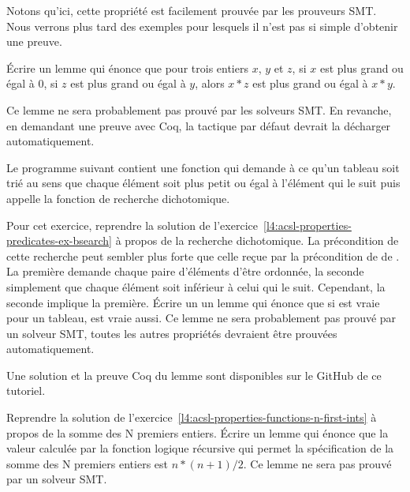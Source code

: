 Notons qu'ici, cette propriété est facilement prouvée par les prouveurs SMT. Nous
verrons plus tard des exemples pour lesquels il n'est pas si simple d'obtenir une
preuve.







Écrire un lemme qui énonce que pour trois entiers $x$, $y$ et $z$, si $x$ est
plus grand ou égal à $0$, si $z$ est plus grand ou égal à $y$, alors $x * z$ 
est  plus grand ou égal à $x * y$.


Ce lemme ne sera probablement pas prouvé par les solveurs SMT. En revanche, en
demandant une preuve avec Coq, la tactique par défaut devrait la décharger
automatiquement.


\label{l4:acsl-properties-lemmas-lsorted-gsorted}


Le programme suivant contient une fonction qui demande à ce qu'un tableau soit
trié au sens que chaque élément soit plus petit ou égal à l'élément qui le suit
puis appelle la fonction de recherche dichotomique.




Pour cet exercice, reprendre la solution de 
l'exercice~\ref{l4:acsl-properties-predicates-ex-bsearch} à propos de la recherche
dichotomique. La précondition de cette recherche peut sembler plus forte que celle
reçue par la précondition de de . La première demande
chaque paire d'éléments d'être ordonnée, la seconde simplement que chaque élément
soit inférieur à celui qui le suit. Cependant, la seconde implique la première.
Écrire un un lemme qui énonce que si  est vraie
pour un tableau,  est vraie aussi. Ce lemme ne sera probablement
pas prouvé par un solveur SMT, toutes les autres propriétés devraient être prouvées
automatiquement.


Une solution et la preuve Coq du lemme sont disponibles sur le GitHub de ce tutoriel.


\label{l4:acsl-properties-lemmas-n-first-ints}


Reprendre la solution de l'exercice~\ref{l4:acsl-properties-functions-n-first-ints}
à propos de la somme des N premiers entiers. Écrire un lemme qui énonce que la valeur
calculée par la fonction logique récursive qui permet la spécification de la somme des
N premiers entiers est $n*(n+1)/2$. Ce lemme ne sera pas prouvé par un solveur SMT.



